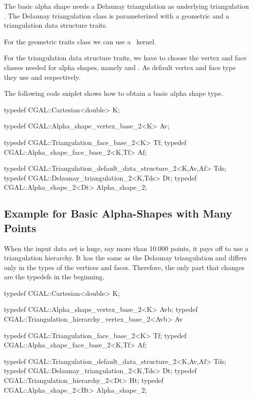 The basic alpha shape needs a Delaunay triangulation as
underlying triangulation .  The Delaunay triangulation class is
parameterized with a geometric and a triangulation data structure traits.

For the geometric traits class we can use a \cgal\ kernel.

For the triangulation data structure traits, we have to
choose the vertex and face classes needed for alpha shapes,
namely  and .
As default vertex and face type they use 
and   respectively. 



The following code sniplet shows how to obtain a basic
alpha shape type.

\begin{cprog}
typedef CGAL::Cartesian<double> K;

typedef CGAL::Alpha_shape_vertex_base_2<K> Av;

typedef CGAL::Triangulation_face_base_2<K> Tf;
typedef CGAL::Alpha_shape_face_base_2<K,Tf> Af;

typedef CGAL::Triangulation_default_data_structure_2<K,Av,Af> Tds;
typedef CGAL::Delaunay_triangulation_2<K,Tds> Dt;
typedef CGAL::Alpha_shape_2<Dt> Alpha_shape_2;
\end{cprog}


\subsection{Example for Basic Alpha-Shapes with Many Points
         \label{I1_SectClassicAS2DHier}}

When the input data set is huge, say more than 10.000 points, it pays
off to use a triangulation hierarchy. It has the same  as the
Delaunay triangulation and differs only in the types of the vertices
and faces. Therefore, the only part that changes are the typedefs in the beginning.

\begin{cprog}
typedef CGAL::Cartesian<double> K;

typedef CGAL::Alpha_shape_vertex_base_2<K> Avb;
typedef CGAL::Triangulation_hierarchy_vertex_base_2<Avb> Av 

typedef CGAL::Triangulation_face_base_2<K> Tf;
typedef CGAL::Alpha_shape_face_base_2<K,Tf> Af;

typedef CGAL::Triangulation_default_data_structure_2<K,Av,Af> Tds;
typedef CGAL::Delaunay_triangulation_2<K,Tds> Dt;
typedef CGAL::Triangulation_hierarchy_2<Dt> Ht;
typedef CGAL::Alpha_shape_2<Ht> Alpha_shape_2;
\end{cprog}


